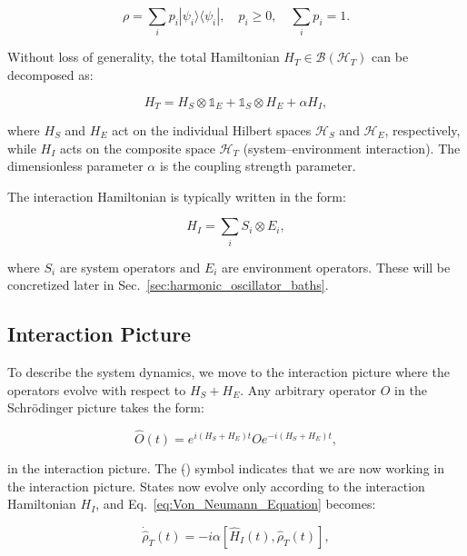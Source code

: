 \begin{equation}
	\rho = \sum_i p_i |\psi_i\rangle \langle \psi_i|, \quad p_i \geq 0, \quad \sum_i p_i = 1.
\end{equation}

\noindent
Without loss of generality, the total Hamiltonian $H_T \in \mathcal{B}(\mathcal{H}_T)$ can be decomposed as:

\begin{equation}
	H_T = H_S \otimes \mathds{1}_E + \mathds{1}_S \otimes H_E + \alpha H_I,
	\label{eq:Total_Hamiltonian}
\end{equation}

\noindent
where $H_S$ and $H_E$ act on the individual Hilbert spaces $\mathcal{H}_S$ and $\mathcal{H}_E$, respectively, while $H_I$ acts on the composite space $\mathcal{H}_T$ (system--environment interaction). The dimensionless parameter $\alpha$ is the coupling strength parameter.

\noindent The interaction Hamiltonian is typically written in the form:

\begin{equation}
	H_I = \sum_i S_i \otimes E_i,
	\label{eq:Interaction_Hamiltonian}
\end{equation}

\noindent
where $S_i$ are system operators and $E_i$ are environment operators. These will be concretized later in Sec.~\ref{sec:harmonic_oscillator_baths}.

\subsection{Interaction Picture}

\noindent
To describe the system dynamics, we move to the interaction picture where the operators evolve with respect to $H_S + H_E$. Any arbitrary operator $O$ in the Schrödinger picture takes the form:

\begin{equation}
	\hat{O}(t) = e^{i(H_S+H_E)t} O e^{-i(H_S+H_E)t},
	\label{eq:Interaction_Picture_Operators}
\end{equation}

\noindent
in the interaction picture. The ($\hat{}$) symbol indicates that we are now working in the interaction picture. States now evolve only according to the interaction Hamiltonian $H_I$, and Eq.~\eqref{eq:Von_Neumann_Equation} becomes:

\begin{equation}
	\dot{\hat{\rho}}_T(t) = -i \alpha [\hat{H}_I(t), \hat{\rho}_T(t)],
	\label{eq:LiouvilleVN_interaction_pic}
\end{equation}

